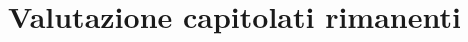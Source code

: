 \documentclass[a4paper]{article}
\begin{document}
	
	
	 
	\pagebreak
	
	\tableofcontents 
	\pagebreak
		
	
	\pagebreak
	
	
	\pagebreak
	
	\section{Valutazione capitolati rimanenti}
	
	\pagebreak
	
	
	\pagebreak
	
	
	\pagebreak
	
	
	\pagebreak
	
	
	\pagebreak
	
\end{document}
